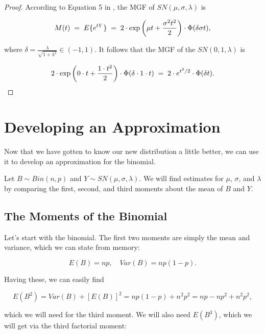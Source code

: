 \documentclass{article}
\begin{document}
\begin{proof}
  According to Equation 5 in \citet{azzalini}, the MGF of $SN(\mu, \sigma,
  \lambda)$ is

  \begin{equation*}
    M(t) \;=\; E\{e^{tY}\} \;=\; 2 \cdot \exp \left( \mu t + \frac{\sigma^2 t^2}{2} \right) \cdot \Phi(\delta \sigma t),
  \end{equation*}

  where $\delta = \frac{\lambda}{\sqrt{1 + \lambda^2}} \in (-1, 1)$. It follows
  that the MGF of the $SN(0, 1, \lambda)$ is

  \begin{equation*}
    2 \cdot \exp \left( 0 \cdot t + \frac{1 \cdot t^2}{2} \right) \cdot \Phi(\delta \cdot 1 \cdot t) \;=\; 2 \cdot e^{t^2/2} \cdot \Phi(\delta t).
  \end{equation*}
\end{proof}

\section{Developing an Approximation}

Now that we have gotten to know our new distribution a little better, we can
use it to develop an approximation for the binomial.

Let $B \sim Bin(n, p)$ and $Y \sim SN(\mu, \sigma, \lambda)$. We will find
estimates for $\mu$, $\sigma$, and $\lambda$ by comparing the first, second,
and third moments about the mean of $B$ and $Y$.

\subsection{The Moments of the Binomial}

Let's start with the binomial. The first two moments are simply the mean and
variance, which we can state from memory:

\begin{equation*}
  E(B) = np, \quad Var(B) = np(1-p).
\end{equation*}

Having these, we can easily find

\begin{equation*}
  E(B^2) = Var(B) + [E(B)]^2 = np(1-p) + n^2p^2 = np - np^2 + n^2p^2,
\end{equation*}

which we will need for the third moment. We will also need $E(B^3)$, which we
will get via the third factorial moment:
\end{document}
